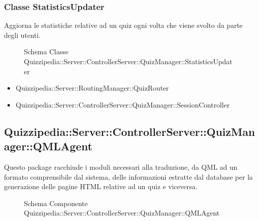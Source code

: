 \subsubsection{Classe StatisticsUpdater}
Aggiorna le statistiche relative ad un quiz ogni volta che viene svolto da parte degli utenti.
\begin{figure}[H]
\centering
\noindent{}
\caption[Schema Classe StatisticsUpdater]{Schema Classe Quizzipedia::Server::ControllerServer::QuizManager::StatisticsUpdater}
\end{figure}
\begin{itemize}
\item Quizzipedia::Server::RoutingManager::QuizRouter
\end{itemize}
\begin{itemize}
\item Quizzipedia::Server::ControllerServer::QuizManager::SessionController
\end{itemize}
\subsection{Quizzipedia::Server::ControllerServer::QuizManager::QMLAgent}
Questo package racchiude i moduli necessari alla traduzione, da QML ad un formato comprensibile dal sistema, delle informazioni estratte dal database per la generazione delle pagine HTML relative ad un quiz e viceversa.
\begin{figure}[H]
\centering
\noindent{}
\caption[Schema Componente Quizzipedia::Server::ControllerServer::QuizManager::QMLAgent]{Schema Componente Quizzipedia::Server::ControllerServer::QuizManager::QMLAgent}
\end{figure}
